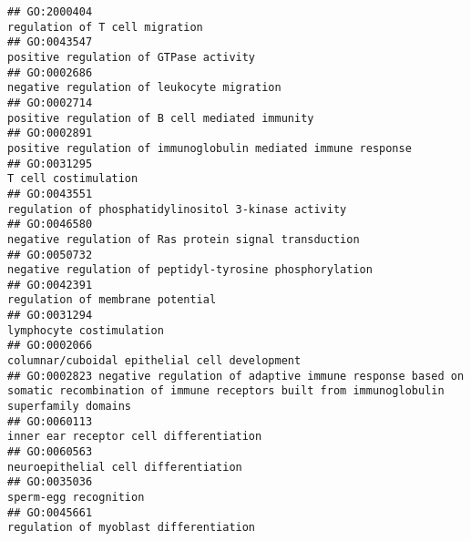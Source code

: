 \documentclass[
]{article}
\begin{document}
\begin{verbatim}
## GO:2000404                                                                                                                   regulation of T cell migration
## GO:0043547                                                                                                           positive regulation of GTPase activity
## GO:0002686                                                                                                       negative regulation of leukocyte migration
## GO:0002714                                                                                                  positive regulation of B cell mediated immunity
## GO:0002891                                                                                   positive regulation of immunoglobulin mediated immune response
## GO:0031295                                                                                                                             T cell costimulation
## GO:0043551                                                                                             regulation of phosphatidylinositol 3-kinase activity
## GO:0046580                                                                                           negative regulation of Ras protein signal transduction
## GO:0050732                                                                                         negative regulation of peptidyl-tyrosine phosphorylation
## GO:0042391                                                                                                                 regulation of membrane potential
## GO:0031294                                                                                                                         lymphocyte costimulation
## GO:0002066                                                                                                    columnar/cuboidal epithelial cell development
## GO:0002823 negative regulation of adaptive immune response based on somatic recombination of immune receptors built from immunoglobulin superfamily domains
## GO:0060113                                                                                                          inner ear receptor cell differentiation
## GO:0060563                                                                                                             neuroepithelial cell differentiation
## GO:0035036                                                                                                                            sperm-egg recognition
## GO:0045661                                                                                                           regulation of myoblast differentiation

\end{verbatim}
\end{document}
